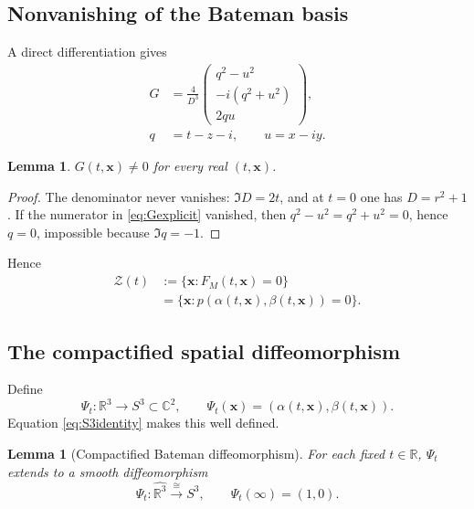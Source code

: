 \documentclass[aps,prd,reprint,nofootinbib,superscriptaddress]{revtex4-2}
\newtheorem{lemma}[theorem]{Lemma}
\theoremstyle{definition}
\theoremstyle{remark}
\newcommand{\R}{\mathbb{R}}
\newcommand{\C}{\mathbb{C}}
\newcommand{\cZ}{\mathcal{Z}}
\begin{document}
\subsection{Nonvanishing of the Bateman basis}

A direct differentiation gives
\begin{align}
G&=\frac{4}{D^3}
\begin{pmatrix}
q^2-u^2\\
-i(q^2+u^2)\\
2qu
\end{pmatrix},
\label{eq:Gexplicit}\\
q&=t-z-i,\qquad u=x-iy.
\nonumber
\end{align}

\begin{lemma}
\label{lem:Gnonzero}
$G(t,\mathbf x)\neq0$ for every real $(t,\mathbf x)$.
\end{lemma}

\begin{proof}
The denominator never vanishes: $\Im D=2t$, and at $t=0$ one has $D=r^2+1$. If the numerator in \eqref{eq:Gexplicit} vanished, then $q^2-u^2=q^2+u^2=0$, hence $q=0$, impossible because $\Im q=-1$.
\end{proof}

Hence
\begin{align}
\cZ(t)&:=\{\mathbf x:F_M(t,\mathbf x)=0\}\nonumber\\
&=\{\mathbf x:p(\alpha(t,\mathbf x),\beta(t,\mathbf x))=0\}.
\label{eq:zeroequiv}
\end{align}

\subsection{The compactified spatial diffeomorphism}

Define
\begin{equation}
\Psi_t:\R^3\longrightarrow S^3\subset\C^2,
\qquad
\Psi_t(\mathbf x)=(\alpha(t,\mathbf x),\beta(t,\mathbf x)).
\label{eq:Psi}
\end{equation}
Equation \eqref{eq:S3identity} makes this well defined.

\begin{lemma}[Compactified Bateman diffeomorphism]
\label{lem:Psidiff}
For each fixed $t\in\R$, $\Psi_t$ extends to a smooth diffeomorphism
\begin{equation}
\Psi_t:\widehat{\R^3}\xrightarrow{\cong}S^3,
\qquad
\Psi_t(\infty)=(1,0).
\label{eq:Psicompact}
\end{equation}
\end{lemma}
\end{document}
